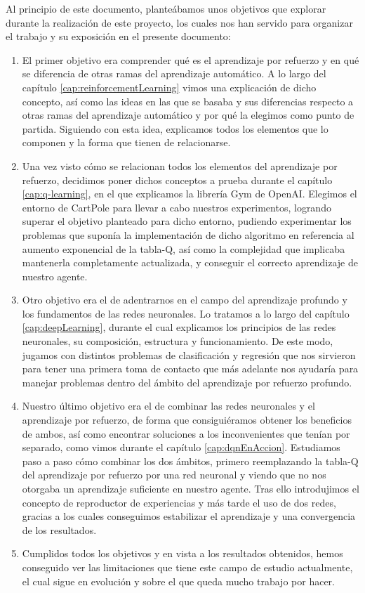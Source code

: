 Al principio de este documento, planteábamos unos objetivos que explorar durante la realización de este proyecto, los cuales nos han servido para organizar el trabajo y su exposición en el presente documento:

\begin{enumerate}
        \item El primer objetivo era comprender qué es el aprendizaje por refuerzo y en qué se diferencia de otras ramas del aprendizaje automático. A lo largo del capítulo \ref{cap:reinforcementLearning} vimos una explicación de dicho concepto, así como las ideas en las que se basaba y sus diferencias respecto a otras ramas del aprendizaje automático y por qué la elegimos como punto de partida. Siguiendo con esta idea, explicamos todos los elementos que lo componen y la forma que tienen de relacionarse.
        \item Una vez visto cómo se relacionan todos los elementos del aprendizaje por refuerzo, decidimos poner dichos conceptos a prueba durante el capítulo \ref{cap:q-learning}, en el que explicamos la librería Gym de OpenAI. Elegimos el entorno de CartPole para llevar a cabo nuestros experimentos, logrando superar el objetivo planteado para dicho entorno, pudiendo experimentar los problemas que suponía la implementación de dicho algoritmo en referencia al aumento exponencial de la tabla-Q, así como la complejidad que implicaba mantenerla completamente actualizada, y conseguir el correcto aprendizaje de nuestro agente.
        \item Otro objetivo era el de adentrarnos en el campo del aprendizaje profundo y los fundamentos de las redes neuronales. Lo tratamos a lo largo del capítulo \ref{cap:deepLearning}, durante el cual explicamos los principios de las redes neuronales, su composición, estructura y funcionamiento. De este modo, jugamos con distintos problemas de clasificación y regresión que nos sirvieron para tener una primera toma de contacto que más adelante nos ayudaría para manejar problemas dentro del ámbito del aprendizaje por refuerzo profundo.
        \item Nuestro último objetivo era el de combinar las redes neuronales y el aprendizaje por refuerzo, de forma que consiguiéramos obtener los beneficios de ambos, así como encontrar soluciones a los inconvenientes que tenían por separado, como vimos durante el capítulo \ref{cap:dqnEnAccion}. Estudiamos paso a paso cómo combinar los dos ámbitos, primero reemplazando la tabla-Q del aprendizaje por refuerzo por una red neuronal y viendo que no nos otorgaba un aprendizaje suficiente en nuestro agente. Tras ello introdujimos el concepto de reproductor de experiencias y más tarde el uso de dos redes, gracias a los cuales conseguimos estabilizar el aprendizaje y una convergencia de los resultados.
        \item Cumplidos todos los objetivos y en vista a los resultados obtenidos, hemos conseguido ver las limitaciones que tiene este campo de estudio actualmente, el cual sigue en evolución y sobre el que queda mucho trabajo por hacer.
\end{enumerate}

